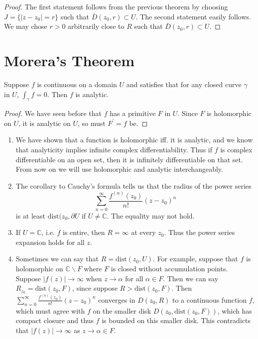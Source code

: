 \begin{proof}
The first statement follows from the previous theorem by choosing
$J = \{ |z - z_0| = r \}$ such that $\bar{D}(z_0, r) \subset U$.
The second statement easily follows.
We may chose $r > 0$ arbitrarily close to $R$ such that
$\bar{D}(z_0, r) \subset U$.
\end{proof}

\section{Morera's Theorem}

\begin{theorem}
Suppose $f$ is continuous on a domain $U$ and satisfies that for any
closed curve $\gamma$ in $U$, $\int_\gamma f = 0$. Then $f$ is analytic.
\end{theorem}

\begin{proof}
We have seen before that $f$ has a primitive $F$ in $U$. Since $F$ is
holomorphic on $U$, it is analytic on $U$, so must $F^\prime = f$ be.
\end{proof}

\begin{remark}
  \begin{enumerate}
    \item{
      We have shown that a function is holomorphic iff. it is analytic,
      and we know that analyticity implies infinite complex
      differentiability. Thus if $f$ is complex differentiable on an open
      set, then it is infinitely differentiable on that set. From now on
      we will use holomorphic and analytic interchangeably.
    }
    \item{
      The corollary to Cauchy's formula tells us that the radius of the power
      series
      $$
      \sum_{n=0}^\infty \frac{f^{(n)}(z_0)}{n!} (z - z_0)^n
      $$
      is at least $\mathrm{dist}(z_0, \partial U$ if $U \neq \mathbb{C}$.
      The equality may not hold.
    }
    \item{
      If $U = \mathbb{C}$, i.e. $f$ is entire, then $R = \infty$ at every
      $z_0$. Thus the power series expansion holds for all $z$.
    }
    \item{
      Sometimes we can say that $R = \mathrm{dist}(z_0, U)$. For example,
      suppose that $f$ is holomorphic on $\mathbb{C} \backslash F$ where
      $F$ is closed without accumulation points. Suppose $|f(z)| \to \infty$
      when $z \to \alpha$ for all $\alpha \in F$. Then we can say
      $R_{z_0} = \mathrm{dist}(z_0, F)$, since suppose $R > \mathrm{dist}(z_0, F)$.
      Then $\sum_{n=0}^\infty \frac{f^{(n)}(z_0)}{n!} (z - z_0)^n$ converges in
      $D(z_0, R)$ to a continuous function $f$, which must agree with $f$ on
      the smaller disk $D(z_0, \mathrm{dist}(z_0, F))$, which has compact closure
      and thus $f$ is bounded on this smaller disk. This contradicts that
      $|f(z)| \to \infty$ as $z \to \alpha \in F$.
    }
  \end{enumerate}
\end{remark}

